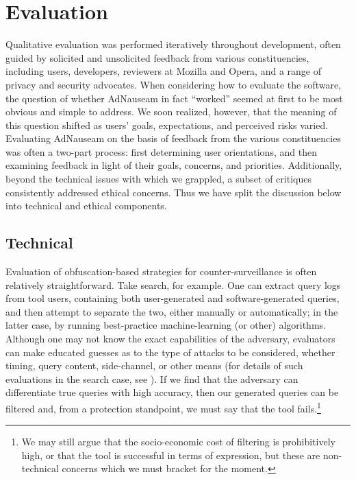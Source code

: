 \documentclass[conference]{IEEEtran}
\begin{document}
\section{Evaluation}

Qualitative evaluation was performed iteratively throughout development, often guided by solicited and unsolicited feedback from various constituencies, including users, developers, reviewers at Mozilla and Opera, and a range of privacy and security advocates. When considering how to evaluate the software, the question of whether AdNauseam in fact “worked” seemed at first to be most obvious and simple to address. We soon realized, however, that the meaning of this question shifted as users' goals, expectations, and perceived risks varied. Evaluating AdNauseam on the basis of feedback from the various constituencies was often a two-part process: first determining user orientations, and then examining feedback in light of their goals, concerns, and priorities. Additionally, beyond the technical issues with which we grappled, a subset of critiques consistently addressed ethical concerns. Thus we have split the discussion below into technical and ethical components.

\subsection{Technical}

Evaluation of obfuscation-based strategies for counter-surveillance is often relatively straightforward. Take search, for example. One can extract query logs from tool users, containing both user-generated and software-generated queries, and then attempt to separate the two, either manually or automatically; in the latter case, by running best-practice machine-learning (or other) algorithms. Although one may not know the exact capabilities of the adversary, evaluators can make educated guesses as to the type of attacks to be considered, whether timing, query content, side-channel, or other means (for details of such evaluations in the search case, see \cite{Gervais}). If we find that the adversary can differentiate true queries with high accuracy, then our generated queries can be filtered and, from a protection standpoint, we must say that the tool fails.\footnote{We may still argue that the socio-economic cost of filtering is prohibitively high, or that the tool is successful in terms of expression, but these are non-technical concerns which we must bracket for the moment.}

\end{document}
